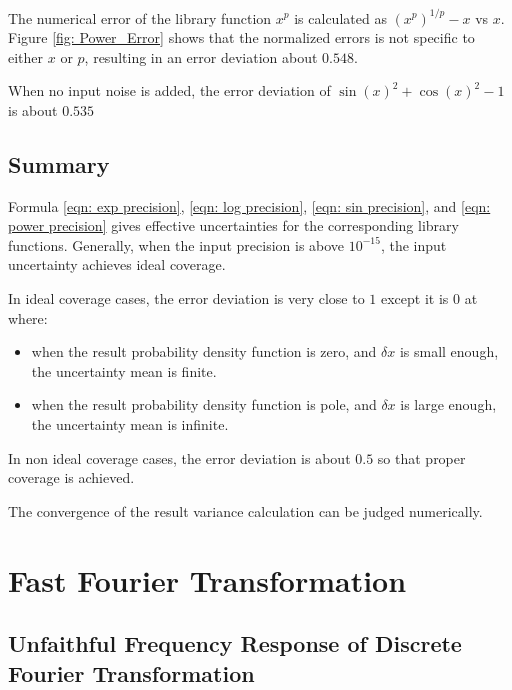 \documentclass[twoside]{article}
\numberwithin{equation}{section}
\begin{document}
The numerical error of the library function $x^p$ is calculated as $(x^p)^{1/p} - x$ vs $x$.
Figure \ref{fig: Power_Error} shows that the normalized errors is not specific to either $x$ or $p$, resulting in an error deviation about $0.548$.

When no input noise is added, the error deviation of $\sin(x)^2 + \cos(x)^2 - 1$ is about $0.535$


\subsection{Summary}

Formula \eqref{eqn: exp precision}, \eqref{eqn: log precision}, \eqref{eqn: sin precision}, and \eqref{eqn: power precision} gives effective uncertainties for the corresponding library functions.
Generally, when the input precision is above $10^{-15}$, the input uncertainty achieves ideal coverage.

In ideal coverage cases, the error deviation is very close to $1$ except it is $0$ at where:
\begin{itemize}
\item when the result probability density function is zero, and $\delta x$ is small enough, the uncertainty mean is finite.

\item when the result probability density function is pole, and $\delta x$ is large enough, the uncertainty mean is infinite.
\end{itemize}
In non ideal coverage cases, the error deviation is about $0.5$ so that proper coverage is achieved.

The convergence of the result variance calculation can be judged numerically.



\clearpage
\section{Fast Fourier Transformation}
\label{sec: FFT}


\subsection{Unfaithful Frequency Response of Discrete Fourier Transformation \cite{Prev_Precision_Arithmetic}}

\iffalse
\end{document}
